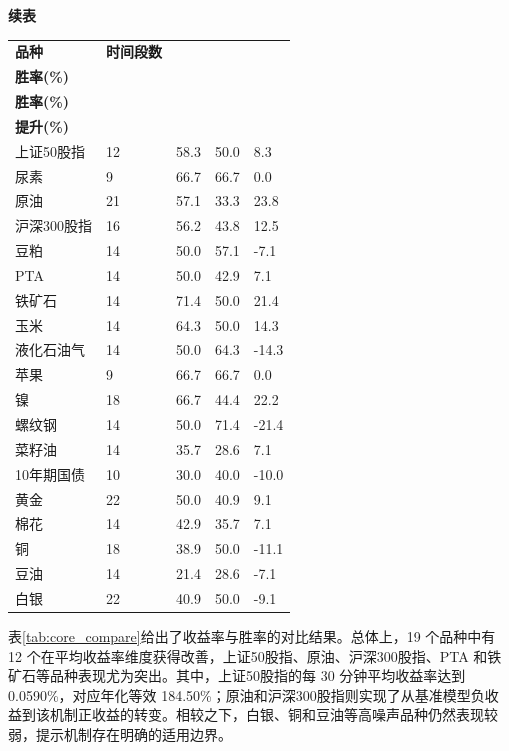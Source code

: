 \begin{table}[!htbp]
\centering
{\small\textbf{续表}}\\[0.5em]
\footnotesize
\setlength{\tabcolsep}{3pt}
\renewcommand{\arraystretch}{1.18}
\begin{tabular}{@{}p{}p{}p{}p{}p{}@{}}
\toprule
\textbf{品种} & \textbf{时间段数} & \makecell{\textbf{孪生对抗}\\\textbf{胜率(\%)}} & \makecell{\textbf{基准模型}\\\textbf{胜率(\%)}} & \makecell{\textbf{胜率}\\\textbf{提升(\%)}} \\
\midrule
上证50股指 & 12 & 58.3 & 50.0 & 8.3 \\
尿素 & 9 & 66.7 & 66.7 & 0.0 \\
原油 & 21 & 57.1 & 33.3 & 23.8 \\
沪深300股指 & 16 & 56.2 & 43.8 & 12.5 \\
豆粕 & 14 & 50.0 & 57.1 & -7.1 \\
PTA & 14 & 50.0 & 42.9 & 7.1 \\
铁矿石 & 14 & 71.4 & 50.0 & 21.4 \\
玉米 & 14 & 64.3 & 50.0 & 14.3 \\
液化石油气 & 14 & 50.0 & 64.3 & -14.3 \\
苹果 & 9 & 66.7 & 66.7 & 0.0 \\
镍 & 18 & 66.7 & 44.4 & 22.2 \\
螺纹钢 & 14 & 50.0 & 71.4 & -21.4 \\
菜籽油 & 14 & 35.7 & 28.6 & 7.1 \\
10年期国债 & 10 & 30.0 & 40.0 & -10.0 \\
黄金 & 22 & 50.0 & 40.9 & 9.1 \\
棉花 & 14 & 42.9 & 35.7 & 7.1 \\
铜 & 18 & 38.9 & 50.0 & -11.1 \\
豆油 & 14 & 21.4 & 28.6 & -7.1 \\
白银 & 22 & 40.9 & 50.0 & -9.1 \\
\bottomrule
\end{tabular}
\end{table}

表\ref{tab:core_compare}给出了收益率与胜率的对比结果。总体上，19 个品种中有 12 个在平均收益率维度获得改善，上证50股指、原油、沪深300股指、PTA 和铁矿石等品种表现尤为突出。其中，上证50股指的每 30 分钟平均收益率达到 0.0590\%，对应年化等效 184.50\%；原油和沪深300股指则实现了从基准模型负收益到该机制正收益的转变。相较之下，白银、铜和豆油等高噪声品种仍然表现较弱，提示机制存在明确的适用边界。

